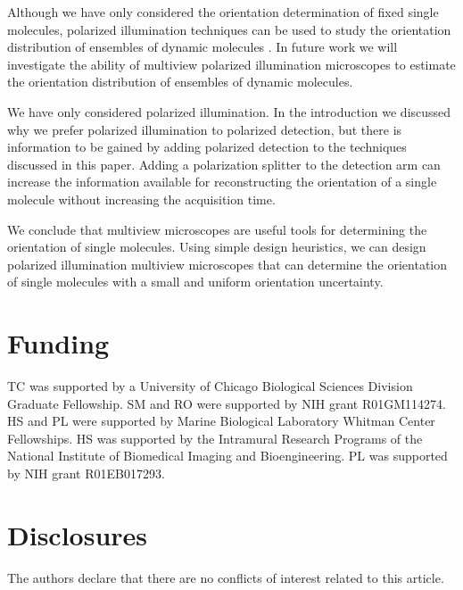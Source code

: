 \documentclass[10pt]{article}
\begin{document}
Although we have only considered the orientation determination of fixed single
molecules, polarized illumination techniques can be used to study the
orientation distribution of ensembles of dynamic molecules \cite{mehta2016,
  backer2016}. In future work we will investigate the ability of multiview
polarized illumination microscopes to estimate the orientation distribution of
ensembles of dynamic molecules.

We have only considered polarized illumination. In the introduction
we discussed why we prefer polarized illumination to polarized detection, but
there is information to be gained by adding polarized detection to the
techniques discussed in this paper. Adding a polarization splitter to the
detection arm can increase the information available for reconstructing the
orientation of a single molecule without increasing the acquisition time.

We conclude that multiview microscopes are useful tools for determining the
orientation of single molecules. Using simple design heuristics, we can design
polarized illumination multiview microscopes that can determine the orientation
of single molecules with a small and uniform orientation uncertainty.

\section*{Funding}
TC was supported by a University of Chicago Biological Sciences Division
Graduate Fellowship. SM and RO were supported by NIH grant R01GM114274. HS and
PL were supported by Marine Biological Laboratory Whitman Center Fellowships.
HS was supported by the Intramural Research Programs of the National Institute
of Biomedical Imaging and Bioengineering. PL was supported by NIH grant
R01EB017293.

\section*{Disclosures}
The authors declare that there are no conflicts of interest related to this article.
\end{document}
